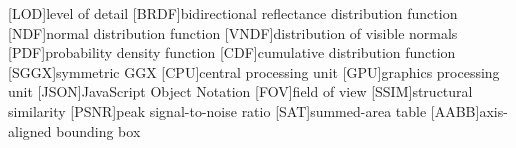 [LOD]{level of detail}
[BRDF]{bidirectional reflectance distribution function}
[NDF]{normal distribution function}
[VNDF]{distribution of visible normals}
[PDF]{probability density function}
[CDF]{cumulative distribution function}
[SGGX]{symmetric GGX}
[CPU]{central processing unit}
[GPU]{graphics processing unit}
[JSON]{JavaScript Object Notation}
[FOV]{field of view}
[SSIM]{structural similarity}
[PSNR]{peak signal-to-noise ratio}
[SAT]{summed-area table}
[AABB]{axis-aligned bounding box}
